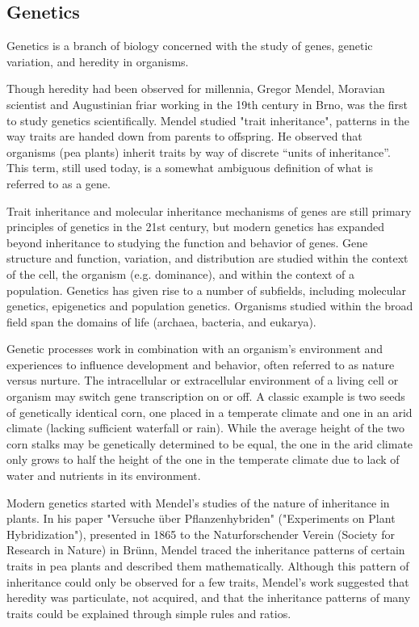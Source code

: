 \subsection{Genetics}
Genetics is a branch of biology concerned with the study of genes, genetic variation, and heredity 
in organisms.

Though heredity had been observed for millennia, Gregor Mendel, Moravian scientist and
Augustinian friar working in the 19th century in Brno, was the first to study genetics 
scientifically.
Mendel studied "trait inheritance", patterns in the way traits are handed down from parents to
offspring.
He observed that organisms (pea plants) inherit traits by way of discrete ``units of inheritance''.
This term, still used today, is a somewhat ambiguous definition of what is referred to as a gene.

Trait inheritance and molecular inheritance mechanisms of genes are still primary principles of
genetics in the 21st century, but modern genetics has expanded beyond inheritance to studying the 
function and behavior of genes.
Gene structure and function, variation, and distribution are studied within the context of the
cell, the organism (e.g. dominance), and within the context of a population.
Genetics has given rise to a number of subfields, including molecular genetics,
epigenetics and population genetics. Organisms studied within the broad field span the domains of
life (archaea, bacteria, and eukarya).

Genetic processes work in combination with an organism's environment and experiences to influence
development and behavior, often referred to as nature versus nurture.
The intracellular or extracellular environment of a living cell or organism may switch gene 
transcription on or off. 
A classic example is two seeds of genetically identical corn, one placed in a temperate
climate and one in an arid climate (lacking sufficient waterfall or rain).
While the average height of the two corn stalks may be genetically determined to be equal, 
the one in the arid climate only grows to half the height of the one in the temperate climate
due to lack of water and nutrients in its environment. 

Modern genetics started with Mendel's studies of the nature of inheritance in plants.
In his paper "Versuche über Pflanzenhybriden" ("Experiments on Plant Hybridization"), 
presented in 1865 to the Naturforschender Verein (Society for Research in Nature) in Brünn,
Mendel traced the inheritance patterns of certain traits in pea plants and described them
mathematically.
Although this pattern of inheritance could only be observed for a few traits, Mendel's work 
suggested that heredity was particulate, not acquired, and that the inheritance patterns of
many traits could be explained through simple rules and ratios.

